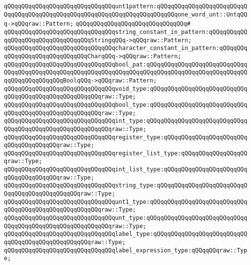 \verb|qQQqqQQqqQQqqQQqqQQqqQQqqQQqqQQqunt1pattern:qQQqqQQqqQQqqQQqqQQqqQQqqQQqqQQqqQQqqQQqqQQqqQQqqQQqqQQqqQQqqQQqqQQqqQQqqQQqone_word_unt::UntqQQq->qQQqraw::Pattern;|\newline
\verb|qQQqqQQqqQQqqQQqqQQqqQQqqQQqqQQq#|\newline
\verb|qQQqqQQqqQQqqQQqqQQqqQQqqQQqqQQqstring_constant_in_pattern:qQQqqQQqqQQqqQQqqQQqqQQqqQQqqQQqqQQqStringqQQq->qQQqraw::Pattern;|\newline
\verb|qQQqqQQqqQQqqQQqqQQqqQQqqQQqqQQqcharacter_constant_in_pattern:qQQqqQQqqQQqqQQqqQQqqQQqqQQqqQQqCharqQQq->qQQqraw::Pattern;|\newline
\verb|qQQqqQQqqQQqqQQqqQQqqQQqqQQqqQQqbool_pat:qQQqqQQqqQQqqQQqqQQqqQQqqQQqqQQqqQQqqQQqqQQqqQQqqQQqqQQqqQQqqQQqqQQqqQQqqQQqqQQqqQQqqQQqqQQqqQQqqQQqqQQqqQQqqQQqqQQqBoolqQQq->qQQqraw::Pattern;|\newline
\newline
\verb|qQQqqQQqqQQqqQQqqQQqqQQqqQQqqQQqvoid_type:qQQqqQQqqQQqqQQqqQQqqQQqqQQqqQQqqQQqqQQqqQQqqQQqqQQqqQQqraw::Type;|\newline
\verb|qQQqqQQqqQQqqQQqqQQqqQQqqQQqqQQqbool_type:qQQqqQQqqQQqqQQqqQQqqQQqqQQqqQQqqQQqqQQqqQQqqQQqqQQqqQQqraw::Type;|\newline
\verb|qQQqqQQqqQQqqQQqqQQqqQQqqQQqqQQqint_type:qQQqqQQqqQQqqQQqqQQqqQQqqQQqqQQqqQQqqQQqqQQqqQQqqQQqqQQqqQQqraw::Type;|\newline
\verb|qQQqqQQqqQQqqQQqqQQqqQQqqQQqqQQqregister_type:qQQqqQQqqQQqqQQqqQQqqQQqqQQqqQQqqQQqqQQqraw::Type;|\newline
\verb|qQQqqQQqqQQqqQQqqQQqqQQqqQQqqQQqregister_list_type:qQQqqQQqqQQqqQQqqQQqraw::Type;|\newline
\verb|qQQqqQQqqQQqqQQqqQQqqQQqqQQqqQQqint_list_type:qQQqqQQqqQQqqQQqqQQqqQQqqQQqqQQqqQQqqQQqraw::Type;|\newline
\verb|qQQqqQQqqQQqqQQqqQQqqQQqqQQqqQQqstring_type:qQQqqQQqqQQqqQQqqQQqqQQqqQQqqQQqqQQqqQQqqQQqqQQqraw::Type;|\newline
\verb|qQQqqQQqqQQqqQQqqQQqqQQqqQQqqQQqunt1_type:qQQqqQQqqQQqqQQqqQQqqQQqqQQqqQQqqQQqqQQqqQQqqQQqqQQqqQQqraw::Type;|\newline
\verb|qQQqqQQqqQQqqQQqqQQqqQQqqQQqqQQqunt_type:qQQqqQQqqQQqqQQqqQQqqQQqqQQqqQQqqQQqqQQqqQQqqQQqqQQqqQQqqQQqraw::Type;|\newline
\verb|qQQqqQQqqQQqqQQqqQQqqQQqqQQqqQQqlabel_type:qQQqqQQqqQQqqQQqqQQqqQQqqQQqqQQqqQQqqQQqqQQqqQQqqQQqraw::Type;|\newline
\verb|qQQqqQQqqQQqqQQqqQQqqQQqqQQqqQQqlabel_expression_type:qQQqqQQqraw::Type;|\newline
